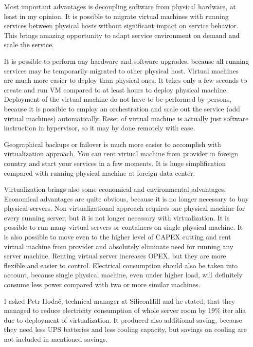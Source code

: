 
Most important advantages is decoupling software from physical hardware, at least in my opinion. It is possible to migrate virtual machines with running services between physical hosts without significant impact on service behavior. This brings amazing opportunity to adapt service environment on demand and scale the service.

It is possible to perform any hardware and software upgrades, because all running services may be temporarily migrated to other physical host. Virtual machines are much more easier to deploy than physical ones. It takes only a few seconds to create and run \Ac{VM} compared to at least hours to deploy physical machine. Deployment of the virtual machine do not have to be performed by persons, because it is possible to employ an orchestration and scale out the service (add virtual machines) automatically.
Reset of virtual machine is actually just software instruction in hypervisor, so it may by done remotely with ease.

Geographical backups or failover is much more easier to accomplish with virtualization approach. You can rent virtual machine from provider in foreign country and start your services in a few moments. It is huge simplification compared with running physical machine at foreign data center.

Virtualization brings also some economical and environmental advantages. Economical advantages are quite obvious, because it is no longer necessary to buy physical servers. Non-virtualizational approach requires one physical machine for every running server, but it is not longer necessary with virtualization. It is possible to run many virtual servers or containers on single physical machine. It is also possible to move even to the higher level of \Ac{CAPEX} cutting and rent virtual machine from provider and absolutely eliminate need for running any server machine. Renting virtual server increases \Ac{OPEX}, but they are more flexible and easier to control.
Electrical consumption should also be taken into account, because single physical machine, even under higher load, will definitely consume less power compared with two or more similar machines. 

I asked Petr Hodač, technical manager at SiliconHill and he stated, that they managed to reduce electricity consumption of whole server room by 19\% iter alia due to deployment of virtualization. It produced also additional saving, because they need less \Ac{UPS} batteries and less cooling capacity, but savings on cooling are not included in mentioned savings.


